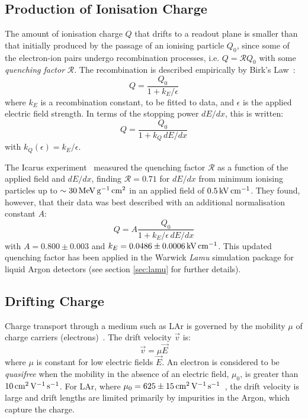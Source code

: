\subsection{Production of Ionisation Charge}\label{sec:production-ionisation-charge}
The amount of ionisation charge $Q$ that drifts to a readout plane is smaller than that initially produced by the passage of an ionising particle $Q_0$, since some of the electron-ion pairs undergo recombination processes, i.e. $Q = \mathcal{R}Q_0$ with some \emph{quenching factor} $\mathcal{R}$. The recombination is described empirically by Birk's Law~\citep{Birks1964}:
\begin{equation}\label{eqn:birks_law}
    Q = \frac{Q_0}{1 + k_E / \epsilon}
\end{equation}
where $k_E$ is a recombination constant, to be fitted to data, and $\epsilon$ is the applied electric field strength. In terms of the stopping power $dE/dx$, this is written:
\begin{equation}\label{eqn:birks_law_dEdx}
    Q = \frac{Q_0}{1 + k_Q\, dE/dx}
\end{equation}
with $k_Q(\epsilon) = k_E / \epsilon$.

The {\sc Icarus} experiment~\citep{Amoruso2004} measured the quenching factor $\mathcal{R}$ as a function of the applied field and $dE/dx$, finding $\mathcal{R} = 0.71$ for $dE/dx$ from minimum ionising particles up to $\sim 30 \,\mathrm{MeV} \,\mathrm{g}^{-1} \,\mathrm{cm}^2$ in an applied field of $0.5 \,\mathrm{kV} \,\mathrm{cm}^{-1}$. They found, however, that their data was best described with an additional normalisation constant $A$:
\begin{equation}\label{eqn:icarus_quenching}
Q = A\frac{Q_0}{1 + k_E/\epsilon \, dE/dx}
\end{equation}
with $A=0.800\pm0.003$ and $k_E = 0.0486\pm 0.0006 \,\mathrm{kV} \,\mathrm{cm}^{-1}$. This updated quenching factor has been applied in the Warwick \emph{Lamu} simulation package for liquid Argon detectors (see section \ref{sec:lamu} for further details).

\subsection{Drifting Charge}
Charge transport through a medium such as \ac{LAr} is governed by the mobility $\mu$ of charge carriers (electrons)~\citep{Aprile2006}. The drift velocity $\vec{v}$ is:
\begin{equation}\label{eqn:charge_transport}
    \vec{v} = \mu \vec{E}
\end{equation}
where $\mu$ is constant for low electric fields $\vec{E}$. An electron is considered to be \emph{quasifree} when the mobility in the absence of an electric field, $\mu_0$, is greater than $10 \,\mathrm{cm}^2 \,\mathrm{V}^{-1} \,\mathrm{s}^{-1}$. For \ac{LAr}, where $\mu_0 = 625 \pm 15 \,\mathrm{cm}^2 \,\mathrm{V}^{-1} \,\mathrm{s}^{-1}$~\citep{Aprile2006}, the drift velocity is large and drift lengths are limited primarily by impurities in the Argon, which capture the charge.

